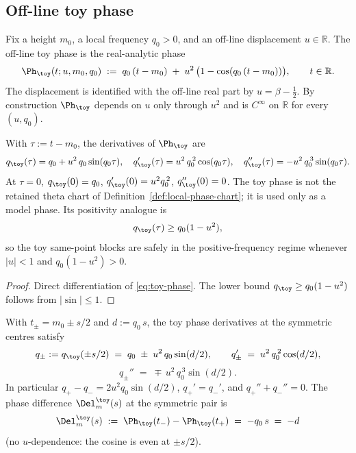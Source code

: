 \subsection{Off-line toy phase}
\label{subsec:off-line-toy-phase}

\begin{definition}
\label{def:off-line-toy-phase}
Fix a height \(m_0\), a local frequency \(q_0>0\), and an off-line
displacement \(u\in\mathbb R\).  The off-line toy phase is the
real-analytic phase
\begin{equation}
\label{eq:toy-phase}
\Ph_\toy(t;u,m_0,q_0)
\;:=\;q_0\,(t-m_0)\;+\;u^2\,\bigl(1-\cos(q_0\,(t-m_0))\bigr),
\qquad t\in\mathbb R.
\end{equation}
The displacement is identified with the off-line real part by
\(u=\beta-\tfrac12\).  By construction \(\Ph_\toy\) depends on \(u\)
only through \(u^2\) and is \(C^\infty\) on \(\mathbb R\) for every
\((u,q_0)\).
\end{definition}

\begin{lemma}
\label{lem:toy-phase-derivatives}
With \(\tau:=t-m_0\), the derivatives of \(\Ph_\toy\) are
\begin{equation}
\label{eq:toy-phase-derivatives}
q_\toy(\tau)
=q_0+u^2\,q_0\sin(q_0\tau),
\quad
q_\toy'(\tau)=u^2\,q_0^{\,2}\cos(q_0\tau),
\quad
q_\toy''(\tau)=-u^2\,q_0^{\,3}\sin(q_0\tau).
\end{equation}
At \(\tau=0\),
\(q_\toy(0)=q_0\), \(q_\toy'(0)=u^2 q_0^{\,2}\),
\(q_\toy''(0)=0\).  The toy phase is not the retained theta chart of
Definition~\ref{def:local-phase-chart}; it is used only as a model
phase.  Its positivity analogue is
\[
        q_\toy(\tau)\ge q_0(1-u^2),
\]
so the toy same-point blocks are safely in the positive-frequency regime
whenever \(|u|<1\) and \(q_0(1-u^2)>0\).
\end{lemma}

\begin{proof}
Direct differentiation of \eqref{eq:toy-phase}.  The lower bound
\(q_\toy\ge q_0(1-u^2)\) follows from \(|\sin|\le 1\).
\end{proof}

\begin{lemma}
\label{lem:q-pm-split-at-centres}
With \(t_\pm=m_0\pm s/2\) and \(d:=q_0\,s\), the toy phase derivatives
at the symmetric centres satisfy
\begin{equation}
\label{eq:q-pm-symmetric-split}
q_\pm:=q_\toy(\pm s/2)\;=\;q_0\;\pm\;u^2\,q_0\sin(d/2),
\qquad
q_\pm'\;=\;u^2\,q_0^{\,2}\cos(d/2),
\end{equation}
\[
q_\pm''\;=\;\mp\,u^2\,q_0^{\,3}\sin(d/2).
\]
In particular \(q_+ - q_- = 2 u^2 q_0\sin(d/2)\),
\(q_+' = q_-'\), and \(q_+''+q_-'' = 0\).  The phase difference
\(\Del_m^\toy(s)\) at the symmetric pair is
\begin{equation}
\label{eq:toy-Delta}
\Del_m^\toy(s)\;:=\;\Ph_\toy(t_-)-\Ph_\toy(t_+)\;=\;-q_0\,s\;=\;-d
\end{equation}
(no \(u\)-dependence: the cosine is even at \(\pm s/2\)).
\end{lemma}

